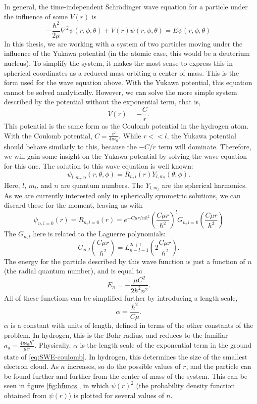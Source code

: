 \documentclass[12pt,twoside]{reedthesis}
\newcommand{\eqn}[1]{\begin{equation}#1\end{equation}}
\begin{document}
In general, the time-independent Schr\"odinger wave equation for a particle under the influence of some $V(r)$ is
\eqn{
-\frac{\hbar^2}{2\mu}\nabla^2\psi(r,\phi,\theta) + V(r)\psi (r,\phi,\theta) = E \psi(r,\phi,\theta)
\label{eq:TIDSWE-general}
}
In this thesis, we are working with a system of two particles moving under the influence of the Yukawa potential (in the atomic case, this would be a deuterium nucleus). To simplify the system, it makes the most sense to express this in spherical coordinates as a reduced mass orbiting a center of mass. This is the form used for the wave equation above. With the Yukawa potential, this equation cannot be solved analytically. However, we can solve the more simple system described by the potential without the exponential term, that is,
\eqn{
 V(r) = -\frac{C}{r}\mbox{.}
 }
This potential is the same form as the Coulomb potential in the hydrogen atom. With the Coulomb potential, $C = \frac{e^2}{4\pi \epsilon_0}$. While $r << l$, the Yukawa potential should behave similarly to this, because the $-C/r$ term will dominate. Therefore, we will gain some insight on the Yukawa potential by solving the wave equation for this one.
The solution to this wave equation is well known:
\eqn{
\psi_{l, m_l, n} (r, \theta, \phi) = R_{n,l}(r) Y_{l,m_l}(\theta,\phi)\mbox{.}
}
Here, $l$, $m_l$, and $n$ are quantum numbers. The $Y_{l, m_l}$ are the spherical harmonics. As we are currently interested only in spherically symmetric solutions, we can discard these for the moment, leaving us with
\eqn{
\psi_{n, l =0}(r) = R_{n , l= 0}(r) = e^{-C \mu r / n \hbar^2}\left(\frac{C \mu r}{\hbar^2}\right)^{l} G_{n, l = 0}\left(\frac{C \mu r}{\hbar^2}\right)
\label{eq:SWE-coulomb}
}
The $G_{n,l}$ here is related to the Laguerre polynomials:
\eqn{
G_{n,l}\left(\frac{C \mu r}{\hbar^2}\right) = L^{2l + 1 }_{n- l -1} \left(2\frac{C \mu r}{\hbar^2}\right)\mbox{.}
}
The energy for the particle described by this wave function is just a function of $n$ (the radial quantum number), and is equal to
\eqn{
E_n = -\frac{\mu C^2}{2\hbar^2 n^2}\mbox{.}
}
All of these functions can be simplified further by introducing a length scale, 
\eqn{
\alpha = \frac{\hbar^2}{C \mu}\mbox{.}
\label{eq:bohrradius}
}
$\alpha$ is a constant with units of length, defined in terms of the other constants of the problem. In hydrogen, this is the Bohr radius, and reduces to the familiar $a_o = \frac{4\pi \epsilon_0 \hbar^2}{\mu e^2}$. Physically, $\alpha$ is the length scale of the exponential term in the ground state of \eqref{eq:SWE-coulomb}. In hydrogen, this determines the size of the smallest electron cloud. As $n$ increases, so do the possible values of $r$, and the particle can be found further and further from the center of mass of the system. This can be seen in figure \ref{fig:hfuncs}, in which $\psi(r)^2$ (the probability density function obtained from $\psi(r)$) is plotted for several values of $n$.
\end{document}
